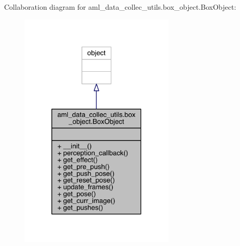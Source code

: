 Collaboration diagram for aml\+\_\+data\+\_\+collec\+\_\+utils.\+box\+\_\+object.\+Box\+Object\+:
\nopagebreak
\begin{figure}[H]
\begin{center}
\leavevmode
\includegraphics[width=211pt]{classaml__data__collec__utils_1_1box__object_1_1_box_object__coll__graph}
\end{center}
\end{figure}
